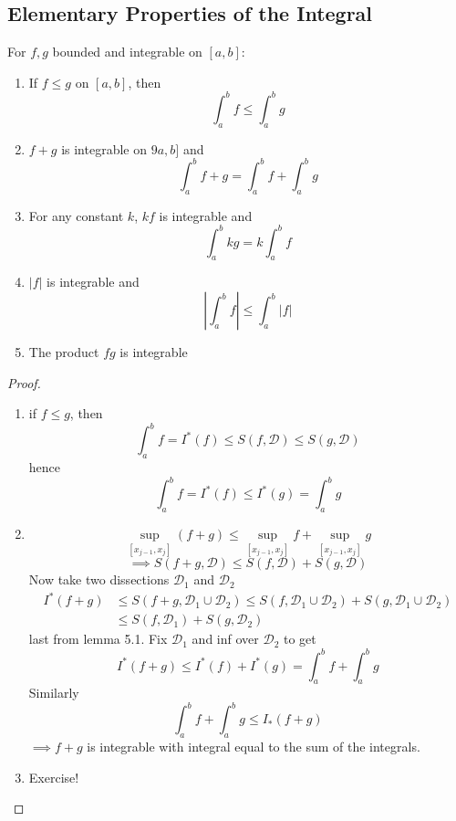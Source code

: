 \subsection{Elementary Properties of the Integral}
\begin{claim}
For $f,g$ bounded and integrable on $[a,b]$:
\begin{enumerate}
    \item If $f\leq g$ on $[a,b]$, then
    \[\int_a^bf \leq \int_a^b g\]
    \item $f + g$ is integrable on $9a,b]$ and
    \[\int_a^b f + g = \int_a^bf + \int_a^b g\]
    \item For any constant $k$, $kf$ is integrable and
    \[\int_a^bkg = k\int_a^b f\]
    \item $|f|$ is integrable and
    \[\left|\int_a^bf\right|\leq \int_a^b|f|\]
    \item The product $fg$ is integrable
\end{enumerate}
\begin{proof}
\hfill{ }
\begin{enumerate}
    \item if $f\leq g$, then
    \[\int_a^bf = I^*(f)\leq S(f,\mathcal{D})\leq S(g,\mathcal{D})\]
    hence
    \[\int_a^bf = I^*(f)\leq I^*(g) =\int_a^b g\]
    \item \[\sup_{[x_{j-1},x_j]}(f+g)\leq \sup_{[x_{j-1},x_j]} f + \sup_{[x_{j-1},x_j]} g\]
    \[\implies S(f+g,\mathcal{D})\leq S(f,\mathcal{D}) + S(g,\mathcal{D})\]
    Now take two dissections $\mathcal{D}_1$ and $\mathcal{D}_2$
    \begin{align*}
        I^*(f+g) &\leq S(f+g,\mathcal{D}_1\cup\mathcal{D}_2)\leq S(f,\mathcal{D}_1\cup\mathcal{D}_2) + S(g,\mathcal{D}_1\cup\mathcal{D}_2)\\
        &\leq S(f,\mathcal{D}_1) + S(g,\mathcal{D}_2)
    \end{align*}
    last from lemma 5.1. Fix $\mathcal{D}_1$ and inf over $\mathcal{D}_2$ to get
    \[I^*(f+g) \leq I^*(f) + I^*(g) = \int_a^b f + \int_a^b g\]
    Similarly
    \[\int_a^b f + \int_a^b g \leq I_*(f+g)\]
    $\implies f + g$ is integrable  with integral equal to the sum of the integrals.
    \item Exercise!
    \end{enumerate}
\end{proof}
\end{claim}
